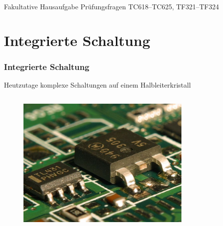 \begin{frame}
  \begin{exampleblock}{Fakultative Hausaufgabe}
    Prüfungsfragen TC618--TC625, TF321--TF324
  \end{exampleblock}
\end{frame}

\section*{Integrierte Schaltung}
\begin{frame}
  \frametitle{Integrierte Schaltung}
  Heutzutage komplexe Schaltungen auf einem Halbleiterkristall
  \begin{columns}
    \begin{center}
      \begin{figure}
        \includegraphics[width=\textwidth,height=.6\textheight,keepaspectratio]{a06/IC.jpg}
      \end{figure}
    \end{center}
    \begin{center}
      \begin{figure}

\end{figure}
\end{center}
\end{columns}
\end{frame}
